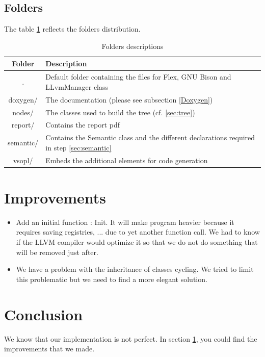 \documentclass[a4paper,11pt]{article}
\begin{document}
  \subsection{Folders}
    The table \ref{fig:folders} reflects the folders distribution.
    \begin{table}[H]
      \begin{tabular}{|c|p{10cm}|}
      \hline
      Folder & Description\\
      \hline\hline
      . &  Default folder containing the files for Flex, GNU Bison and LLvmManager class  \\\hline
      doxygen/ & The documentation (please see subsection \ref{Doxygen}) \\\hline
      nodes/ & The classes used to build the tree (cf. \ref{sec:tree})\\\hline
      report/ & Contains the report pdf\\\hline
      semantic/ & Contains the Semantic class and the different declarations required in step \ref{sec:semantic}\\\hline
      vsopl/ & Embeds the additional elements for code generation \\\hline
      \end{tabular}
      \caption{\label{fig:folders}Folders descriptions}
    \end{table}
    
\section{Improvements}
  \label{sec:improvements}
  \begin{itemize}
  \item Add an initial function : Init. It will make program heavier because it requires saving registries, ... 
  due to yet another function call. We had to know if the LLVM compiler would optimize it so that we do not 
  do something that will be removed just after.
  \item We have a problem with the inheritance of classes cycling. We tried to limit this problematic but we need to find
  a more elegant solution.
  \end{itemize}


\section{Conclusion}

  We know that our implementation is not perfect. In section \ref{sec:improvements}, you could find the improvements that we made.
\end{document}
